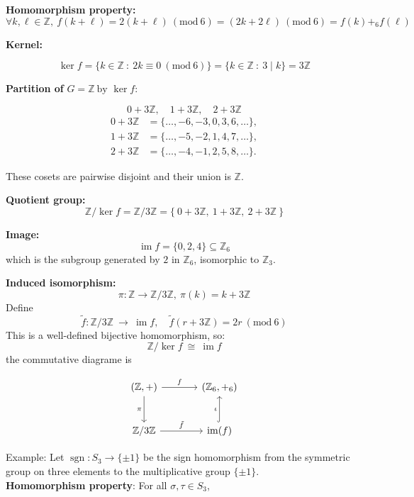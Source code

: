 \documentclass[12pt]{article}
\begin{document}
\textbf{Homomorphism property:} 
$$
\forall k, \ell \in \mathbb{Z}, \ 
f(k + \ell) = 2(k + \ell) \ (\mathrm{mod}\ 6) 
= (2k + 2\ell) \ (\mathrm{mod}\ 6) 
= f(k) +_6 f(\ell)
$$

\textbf{Kernel:}

$$\ker f = \{ k \in \mathbb{Z} \ : \ 2k \equiv 0 \ (\mathrm{mod}\ 6) \}
= \{ k \in \mathbb{Z} \ : \ 3 \mid k \}
= 3\mathbb{Z}
$$


\textbf{Partition of } $G = \mathbb{Z} \ \text{by } \ker f:$

$$
0 + 3\mathbb{Z}, \quad 1 + 3\mathbb{Z}, \quad 2 + 3\mathbb{Z}
$$
$$
\begin{aligned}
	0 + 3\mathbb{Z} &= \{\dots,-6,-3,0,3,6,\dots\}, \\
	1 + 3\mathbb{Z} &= \{\dots,-5,-2,1,4,7,\dots\}, \\
	2 + 3\mathbb{Z} &= \{\dots,-4,-1,2,5,8,\dots\}.
\end{aligned}
$$

These cosets are pairwise disjoint and their union is $\mathbb{Z}$.


\textbf{Quotient group:} 
$$
\mathbb{Z} / \ker f = \mathbb{Z} / 3\mathbb{Z} 
= \{ \ 0 + 3\mathbb{Z}, \ 1 + 3\mathbb{Z}, \ 2 + 3\mathbb{Z} \ \}
$$


\textbf{Image:}
$$
\operatorname{im} f = \{0, 2, 4\} \subseteq \mathbb{Z}_6
$$
which is the subgroup generated by $2$ in $\mathbb{Z}_6$, isomorphic to $\mathbb{Z}_3$.

\textbf{Induced isomorphism:}
$$
\pi : \mathbb{Z} \to \mathbb{Z} / 3\mathbb{Z}, \ 
\pi(k) = k + 3\mathbb{Z}
$$
Define
$$
\tilde{f} : \mathbb{Z} / 3\mathbb{Z} \ \longrightarrow \ \operatorname{im} f, 
\quad \tilde{f}(r + 3\mathbb{Z}) = 2r \ (\mathrm{mod}\ 6)
$$
This is a well-defined bijective homomorphism, so:
$$
\mathbb{Z} / \ker f \ \cong \ \operatorname{im} f
$$
the commutative diagrame is

$$
\begin{tikzcd}[row sep=large, column sep=large]
	(\mathbb{Z}, +) \arrow[r, "f"] \arrow[d, "\pi"'] 
	& (\mathbb{Z}_6, +_6) \\
	\mathbb{Z}/3\mathbb{Z} \arrow[r, "\tilde{f}"] 
	& \operatorname{im}(f) \arrow[u, hook, "\iota"]
\end{tikzcd}
$$

Example: Let $ \operatorname{sgn} : S_3 \longrightarrow \{\pm 1\}$ be the sign homomorphism from the symmetric group on three elements to the multiplicative group $\{\pm 1\}$.
\vspace{0.5cm} \\
\textbf{Homomorphism property}: For all $\sigma, \tau \in S_3$,
\end{document}
